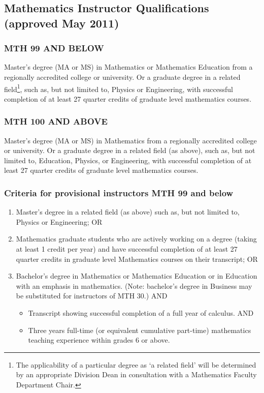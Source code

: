 \subsection{Mathematics Instructor Qualifications (approved May 2011)}
\subsubsection{MTH 99 AND BELOW}
Master's degree (MA or MS) in Mathematics or Mathematics Education from a regionally accredited college or university.  Or a graduate degree in a related field\footnote{The applicability of a particular degree as `a related field' will be determined by an appropriate Division Dean in consultation with a Mathematics Faculty Department Chair.
    }, such as, but not limited to, Physics or Engineering, with successful completion of at least 27 quarter credits of graduate level mathematics courses.
\subsubsection{MTH 100 AND ABOVE}
Master's degree (MA or MS) in Mathematics from a regionally accredited college or university.  Or a graduate degree in a related field (as above), such as, but not limited to, Education, Physics, or Engineering, with successful completion of at least 27 quarter credits of graduate level mathematics courses.
\subsubsection{Criteria for provisional instructors MTH 99 and below }
\begin{enumerate}
  \item Master's degree in a related field (as above) such as, but not limited to, Physics or Engineering; OR
  \item Mathematics graduate students who are actively working on a degree (taking at least 1 credit per year) and have successful completion of at least 27 quarter credits in graduate level Mathematics courses on their transcript; OR
  \item Bachelor's degree in Mathematics or Mathematics Education or in Education with an emphasis in mathematics.  (Note: bachelor's degree in Business may be substituted for instructors of MTH 30.)
    AND 
    \begin{itemize}
      \item Transcript showing successful completion of a full year of calculus.
        AND
      \item Three years full-time (or equivalent cumulative part-time) mathematics teaching experience within grades 6 or above.
    \end{itemize}
\end{enumerate}
